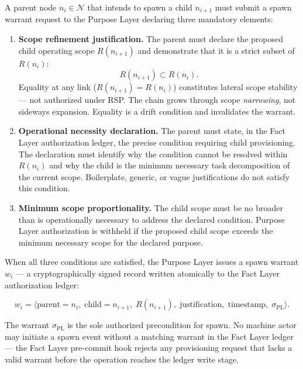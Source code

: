 A parent node $n_i \in \mathcal{N}$ that intends to spawn a child $n_{i+1}$ must submit a spawn warrant request to the Purpose Layer declaring three mandatory elements:

\begin{enumerate}
    \item[(P1)] \textbf{Scope refinement justification.} The parent must declare the proposed child operating scope $R(n_{i+1})$ and demonstrate that it is a strict subset of $R(n_i)$:
    \begin{equation}
    R(n_{i+1}) \subset R(n_i).
    \label{eq:rs-scope-refinement}
    \end{equation}
    Equality at any link ($R(n_{i+1}) = R(n_i)$) constitutes lateral scope stability — not authorized under RSP. The chain grows through scope \emph{narrowing}, not sideways expansion. Equality is a drift condition and invalidates the warrant.

    \item[(P2)] \textbf{Operational necessity declaration.} The parent must state, in the Fact Layer authorization ledger, the precise condition requiring child provisioning. The declaration must identify why the condition cannot be resolved within $R(n_i)$ and why the child is the minimum necessary task decomposition of the current scope. Boilerplate, generic, or vague justifications do not satisfy this condition.

    \item[(P3)] \textbf{Minimum scope proportionality.} The child scope must be no broader than is operationally necessary to address the declared condition. Purpose Layer authorization is withheld if the proposed child scope exceeds the minimum necessary scope for the declared purpose.
\end{enumerate}

When all three conditions are satisfied, the Purpose Layer issues a spawn warrant $w_i$ — a cryptographically signed record written atomically to the Fact Layer authorization ledger:

\begin{equation}
w_i = \bigl\langle
\text{parent}=n_i,\;
\text{child}=n_{i+1},\;
R(n_{i+1}),\;
\text{justification},\;
\text{timestamp},\;
\sigma_{\text{PL}}
\bigr\rangle .
\label{eq:rs-spawn-warrant}
\end{equation}

The warrant $\sigma_{\text{PL}}$ is the sole authorized precondition for spawn. No machine actor may initiate a spawn event without a matching warrant in the Fact Layer ledger — the Fact Layer pre-commit hook rejects any provisioning request that lacks a valid warrant before the operation reaches the ledger write stage.

